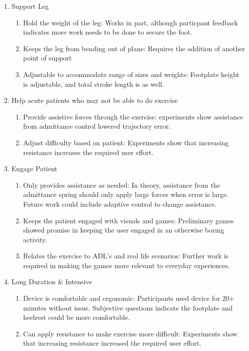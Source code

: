 \documentclass[12pt]{report}
\begin{document}
\begin{enumerate}[label*=\arabic*.]
	\item Support Leg
	\begin{enumerate}[label*=\arabic*.]
		\item Hold the weight of the leg: Works in part, although particpant feedback indicates more work needs to be done to secure the foot. 
		\item Keeps the leg from bending out of plane: Requires the addition of another point of support
		\item Adjustable to accommodate range of sizes and weights: Footplate height is adjustable, and total stroke length is as well. 
	\end{enumerate}
	\item Help acute patients who may not be able to do exercise
	\begin{enumerate}[label*=\arabic*.]
		\item Provide assistive forces through the exercise: experiments show assistance from admittance control lowered trajectory error.
		\item Adjust difficulty based on patient: Experiments show that increasing resistance increases the required user effort. 
	\end{enumerate}
	\item Engage Patient
	\begin{enumerate}[label*=\arabic*.]
		\item Only provides assistance as needed: In theory, assistance from the admittance spring should only apply large forces when error is large. Future work could include adaptive control to change assistance. 
		\item Keeps the patient engaged with visuals and games: Preliminary games showed promise in keeping the user engaged in an otherwise boring activity. 
		\item Relates the exercise to ADL's and real life scenarios: Further work is required in making the games more relevant to everyday experiences. 
	\end{enumerate}
	\item Long Duration \& Intensive
	\begin{enumerate}[label*=\arabic*.]
		\item Device is comfortable and ergonomic: Participants used device for 20+ minutes without issue. Subjective questions indicate the footplate and heelrest could be more comfortable. 
		\item Can apply resistance to make exercise more difficult: Experiments show that increasing resistance increased the required user effort. 

\end{enumerate}
\end{enumerate}
\end{document}
